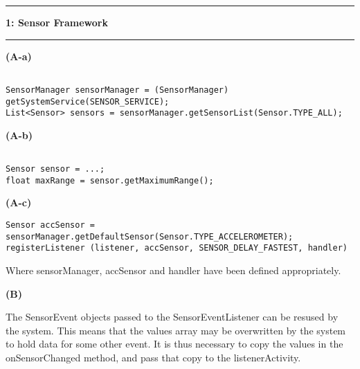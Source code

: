 \documentclass[11pt]{article}
\newcommand\question[2]{\vspace{.25in}\hrule\textbf{#1: #2}\vspace{.5em}\hrule\vspace{.10in}}
\renewcommand\part[1]{\vspace{.10in}\textbf{(#1)}}
\begin{document}
\raggedright

\newcommand\NAME{Lukas, Young, Vincent}  %

\question{1}{Sensor Framework}

\part{A-a}

\begin{small}
\begin{lstlisting}[frame=single]

SensorManager sensorManager = (SensorManager) getSystemService(SENSOR_SERVICE);
List<Sensor> sensors = sensorManager.getSensorList(Sensor.TYPE_ALL);
\end{lstlisting}
\end{small}

\part{A-b}

\begin{small}
\begin{lstlisting}[frame=single]

Sensor sensor = ...;
float maxRange = sensor.getMaximumRange();
\end{lstlisting}
\end{small}

\part{A-c}

\begin{small}
\begin{lstlisting}[frame=single]
Sensor accSensor = sensorManager.getDefaultSensor(Sensor.TYPE_ACCELEROMETER);
registerListener (listener, accSensor, SENSOR_DELAY_FASTEST, handler)
\end{lstlisting}
\end{small}

Where sensorManager, accSensor and handler have been defined appropriately.

\part{B}

The SensorEvent objects passed to the SensorEventListener can be resused by the system. This means that the values array may be overwritten by the system to hold data for some other event. It is thus necessary to copy the values in the onSensorChanged method, and pass that copy to the listenerActivity.
\end{document}
